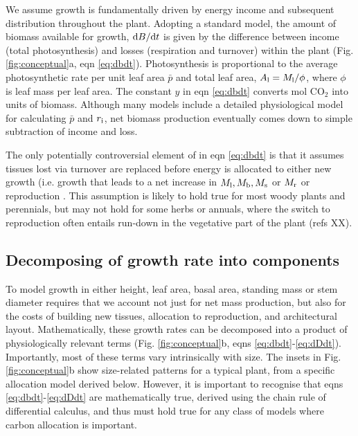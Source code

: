 \documentclass[a4paper,11pt]{article}
\begin{document}
We assume growth is fundamentally driven by energy income and subsequent distribution throughout the plant. Adopting a standard model, the amount of biomass available for growth, ${\rm d}B / {\rm d}t$ is given by the difference between income (total photosynthesis) and losses (respiration and turnover) within the plant \citep{Makela-1997, Thornley-2000, Falster-2011} (Fig. \ref{fig:conceptual}a, eqn \ref{eq:dbdt}). Photosynthesis is proportional to the average photosynthetic rate per unit leaf area $\bar{p}$ and total leaf area, $A_{\rm l} = M_{\rm l} / \phi$, where $\phi$ is leaf mass per leaf area. The constant $y$ in  eqn \ref{eq:dbdt} converts mol CO$_2$ into units of biomass. Although many models include a detailed physiological model for calculating $\bar{p}$ and $r_{\rm i}$, net biomass production eventually comes down to simple subtraction of income and loss.

The only potentially controversial element of in eqn \ref{eq:dbdt} is that it assumes tissues lost via turnover are replaced before energy is allocated to either new growth (i.e. growth that leads to a net increase in $M_{\rm l}, M_{\rm b}, M_{\rm s}$ or $M_{\rm r}$ or reproduction \citep{Thornley-2000}. This assumption is likely to hold true for most woody plants and perennials, but may not hold for some herbs or annuals, where the switch to reproduction often entails run-down in the vegetative part of the plant (refs XX).

\subsection{Decomposing of growth rate into components}

To model growth in either height, leaf area, basal area, standing mass or stem diameter requires that we account not just for net mass production, but also for the costs of building new tissues, allocation to reproduction, and architectural layout. Mathematically, these growth rates can be decomposed into a product of physiologically relevant terms \citep{Falster-2011, Gibert-2016} (Fig. \ref{fig:conceptual}b, eqns \ref{eq:dbdt}-\ref{eq:dDdt}). Importantly, most of these terms vary intrinsically with size. The insets in Fig. \ref{fig:conceptual}b show size-related patterns for a typical plant, from a specific allocation model derived below. However, it is important to recognise that eqns \ref{eq:dbdt}-\ref{eq:dDdt} are mathematically true, derived using the chain rule of differential calculus, and thus must hold true for any class of models where carbon allocation is important.
\end{document}

